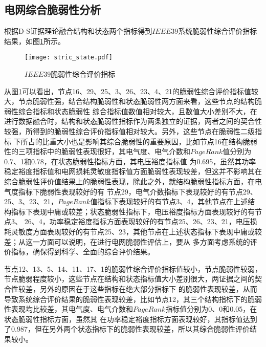 \subsection{电网综合脆弱性分析}
\label{sec:singleAnalysis}
根据D-S证据理论融合结构和状态两个指标得到$IEEE39$系统脆弱性综合评价指标结果，如图\ref{fig:stric_state}所示。
\begin{figure}[H] %
  \centering
  \texttt{[image: stric\_state.pdf]}
  \caption{$IEEE39$脆弱性综合评价指标}
  \label{fig:stric_state}
\end{figure}

从图\ref{fig:stric_state}可以看出，节点16、29、25、3、26、23、4、21的脆弱性综合评价指标值较大，节点脆弱性强，结合结构脆弱性和状态脆弱性两方面来看，这些节点的结构脆弱性综合指标和状态脆弱性
综合指标值数值相对较大，且数值大小差别不大，在进行数据融合时，结构和状态脆弱性指标作为两条独立的证据，两者之间的契合性较强，所得到的脆弱性综合评价指标值相对较大。另外，这些节点在脆弱性二级指标
下所占的比重大小也是影响其综合脆弱性的重要原因，比如节点16在结构脆弱性的三项指标中的脆弱性表现很好，其电气度、电气介数和$PageRank$值分别为0.7、1和0.78，在状态脆弱性指标方面，其电压裕度指标值
为0.695，虽然其功率稳定裕度指标值和电网损耗灵敏度指标值方面脆弱性表现较差，但这并不影响其在综合脆弱性评价值结果上的脆弱性表现，除此之外，就结构脆弱性指标方面，在电气度指标下脆弱性表现较好的有
节点29，电气介数指标下表现较好的有节点29、25、3、23、21，$PageRank$值指标下表现较好的有节点3、4，其他节点在上述结构指标下表现中庸或较差；状态脆弱性指标下，电压裕度指标方面表现较好的有节点3、
26、4，功率稳定裕度指标方面表现较好的有节点25、26、23、21，电压损耗灵敏度方面表现较好的有节点25、23，其他节点在上述状态指标下表现中庸或较差；从这一方面可以说明，在进行电网脆弱性评估上，要从
多方面考虑系统的评价指标，确保得到科学、全面的综合评价结果。

节点12、13、5、14、11、17、1的脆弱性综合评价指标值较小，节点脆弱性较弱，节点脆弱程度较小，这些节点在结构和状态指标值大小差别很大，两证据之间的契合性较差，另外的原因在于这些指标在绝大部分指标下
的脆弱性表现较差，从而导致系统综合评价结果的脆弱性表现较差，比如节点12，其三个结构指标下的脆弱性表现均比较差，其电气度、电气介数和$PageRank$指标值分别为0、0和0.05，在状态脆弱性指标方面，虽然其
在功率稳定裕度指标方面表现较好，其指标值达到了0.987，但在另外两个状态指标下的脆弱性表现较差，所以其综合脆弱性评价结果较小。






